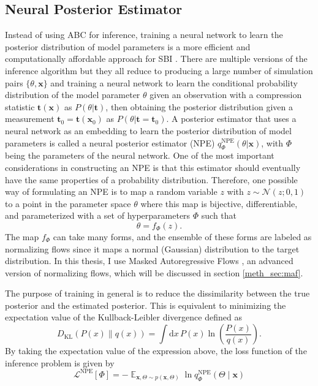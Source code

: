 \subsection{Neural Posterior Estimator} \label{meth_sec:snpe}
Instead of using ABC for inference, training a neural network to learn the posterior distribution of model parameters is a more efficient and computationally affordable approach for SBI \citep{papamakarios2016fast}. There are multiple versions of the inference algorithm but they all reduce to producing a large number of simulation pairs $\{\theta, \mathbf{x}\}$ and training a neural network to learn the conditional probability distribution of the model parameter $\theta$ given an observation with a compression statistic $\mathbf{t}(\mathbf{x})$ as $P(\theta| \mathbf{t})$, then obtaining the posterior distribution given a measurement $\mathbf{t}_0 = \mathbf{t} (\mathbf{x}_0)$ as $P(\theta| \mathbf{t} = \mathbf{t}_0)$. A posterior estimator that uses a neural network as an embedding to learn the posterior distribution of model parameters is called a neural posterior estimator (NPE) $q^\mathrm{NPE}_{\Phi}(\theta|\mathbf{x})$, with $\Phi$ being the parameters of the neural network. One of the most important considerations in constructing an NPE is that this estimator should eventually have the same properties of a probability distribution. Therefore, one possible way of formulating an NPE is to map a random variable $z$ with $z \sim \mathcal{N}(z;0, 1)$ to a point in the parameter space $\theta$ where this map is bijective, differentiable, and parameterized with a set of hyperparameters $\Phi$ such that
\begin{equation} \label{eq:nf}
    \theta = f_\Phi (z).
\end{equation}
The map $f_\Phi$ can take many forms, and the ensemble of these forms are labeled as normalizing flows \citep{rezende2015variational} since it maps a normal (Gaussian) distribution to the target distribution. In this thesis, I use Masked Autoregressive Flows \citep{papamakarios2017masked}, an advanced version of normalizing flows, which will be discussed in section \ref{meth_sec:maf}.

The purpose of training in general is to reduce the dissimilarity between the true posterior and the estimated posterior. This is equivalent to minimizing the expectation value of the Kullback-Leibler divergence defined as
\begin{equation}
    D_{\mathrm{KL}}(P(x) \| q(x)) = \int \mathrm{d}x \, P(x) \ln \left( \frac{P(x)}{q(x)} \right).
\end{equation}
By taking the expectation value of the expression above, the loss function of the inference problem is given by
\begin{equation}
    \mathcal{L}^{\mathrm{NPE}}[\Phi] = - \mathop{\mathbb{E}}_{\boldsymbol{x}, \Theta \sim p(\boldsymbol{x}, \Theta)} \ln q_{\Phi}^{\mathrm{NPE}}(\Theta \mid \boldsymbol{x})
\end{equation}

